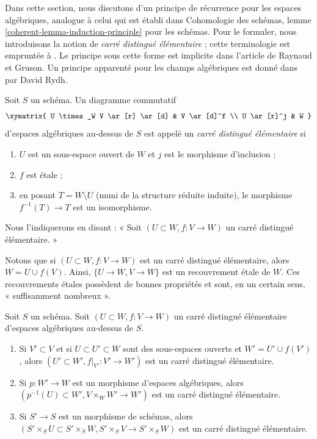 \noindent
Dans cette section, nous discutons d'un principe de récurrence pour les espaces algébriques,
analogue à celui qui est établi dans
Cohomologie des schémas, lemme \ref{coherent-lemma-induction-principle}
pour les schémas. Pour le formuler, nous introduisons la notion de
{\it carré distingué élémentaire} ; cette terminologie est empruntée
à \cite{MV}.
Le principe sous cette forme est implicite dans l'article \cite{GruRay}
de Raynaud et Gruson.
Un principe apparenté pour les champs algébriques est donné dans
\cite[Théorème D]{rydh_etale_devissage} par David Rydh.

\begin{definition}
\label{definition-elementary-distinguished-square}
Soit $S$ un schéma. Un diagramme commutatif
$$
\xymatrix{
U \times_W V \ar[r] \ar[d] & V \ar[d]^f \\
U \ar[r]^j & W
}
$$
d'espaces algébriques au-dessus de $S$ est appelé un {\it carré distingué élémentaire}
si
\begin{enumerate}
\item $U$ est un sous-espace ouvert de $W$ et $j$ est le morphisme d'inclusion ;
\item $f$ est étale ;
\item en posant $T = W \setminus U$ (muni de la structure réduite induite),
le morphisme $f^{-1}(T) \to T$ est un isomorphisme.
\end{enumerate}
Nous l'indiquerons en disant : « Soit $(U \subset W, f : V \to W)$
un carré distingué élémentaire. »
\end{definition}

\noindent
Notons que si $(U \subset W, f : V \to W)$ est un carré distingué
élémentaire, alors $W = U \cup f(V)$. Ainsi, $\{U \to W, V \to W\}$ est
un recouvrement étale de $W$. Ces recouvrements étales possèdent
de bonnes propriétés et sont, en un certain sens,
« suffisamment nombreux ».

\begin{lemma}
\label{lemma-make-more-elementary-distinguished-squares}
Soit $S$ un schéma. Soit $(U \subset W, f : V \to W)$ un carré
distingué élémentaire d'espaces algébriques au-dessus de $S$.
\begin{enumerate}
\item Si $V' \subset V$ et si
$U \subset U' \subset W$ sont des sous-espaces ouverts et $W' = U' \cup f(V')$,
alors $(U' \subset W', f|_{V'} : V' \to W')$ est un carré distingué
élémentaire.
\item Si $p : W' \to W$ est un morphisme d'espaces algébriques, alors
$(p^{-1}(U) \subset W', V \times_W W' \to W')$ est un carré distingué
élémentaire.
\item Si $S' \to S$ est un morphisme de schémas, alors
$(S' \times_S U \subset S' \times_S W, S' \times_S V \to S' \times_S W)$
est un carré distingué élémentaire.
\end{enumerate}
\end{lemma}

